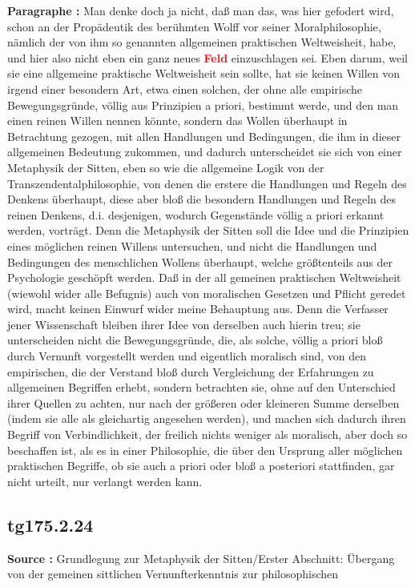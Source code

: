 \documentclass[a4paper,12pt,twoside]{book}
\newcommand{\match}[1]{\textcolor{red}{\textbf{#1}}}
\begin{document}
	\noindent\textbf{Paragraphe : }Man denke doch ja nicht, daß man das, was hier gefodert wird, schon an der Propädeutik des berühmten Wolff vor seiner Moralphilosophie, nämlich der von ihm so genannten allgemeinen praktischen Weltweisheit, habe, und hier also nicht eben ein ganz neues \match{Feld} einzuschlagen sei.  Eben darum, weil sie eine allgemeine praktische Weltweisheit sein sollte, hat sie keinen Willen von irgend einer besondern Art, etwa einen solchen, der ohne alle empirische Bewegungsgründe, völlig aus Prinzipien a priori, bestimmt werde, und den man einen reinen Willen nennen könnte, sondern das Wollen überhaupt in Betrachtung gezogen, mit allen Handlungen und Bedingungen, die ihm in dieser allgemeinen Bedeutung zukommen, und dadurch unterscheidet sie sich von einer Metaphysik der Sitten, eben so wie die allgemeine Logik von der Transzendentalphilosophie, von denen die erstere die Handlungen und Regeln des Denkens überhaupt, diese aber bloß die besondern Handlungen und Regeln des reinen Denkens, d.i. desjenigen, wodurch Gegenstände völlig a priori erkannt werden, vorträgt. Denn die Metaphysik der Sitten soll die Idee und die Prinzipien eines möglichen reinen Willens untersuchen, und nicht die Handlungen und Bedingungen des menschlichen Wollens überhaupt, welche größtenteils aus der Psychologie geschöpft werden. Daß in der all gemeinen praktischen Weltweisheit (wiewohl wider alle Befugnis) auch von moralischen Gesetzen und Pflicht geredet wird, macht keinen Einwurf wider meine Behauptung aus. Denn die Verfasser jener Wissenschaft bleiben ihrer Idee von derselben auch hierin treu; sie unterscheiden nicht die Bewegungsgründe, die, als solche, völlig a priori bloß durch Vernunft vorgestellt werden und eigentlich moralisch sind, von den empirischen, die der Verstand bloß durch Vergleichung der Erfahrungen zu allgemeinen Begriffen erhebt, sondern betrachten sie, ohne auf den Unterschied ihrer Quellen zu achten, nur nach der größeren oder kleineren Summe derselben (indem sie alle als gleichartig angesehen werden), und machen sich dadurch ihren Begriff von Verbindlichkeit, der freilich nichts weniger als moralisch, aber doch so beschaffen ist, als es in einer Philosophie, die über den Ursprung aller möglichen praktischen Begriffe, ob sie auch a priori oder bloß a posteriori stattfinden, gar nicht urteilt, nur verlangt werden kann. 
	
	\subsection*{tg175.2.24} 
	\textbf{Source : }Grundlegung zur Metaphysik der Sitten/Erster Abschnitt: Übergang von der gemeinen sittlichen Vernunfterkenntnis zur philosophischen\\  
	
\end{document}
